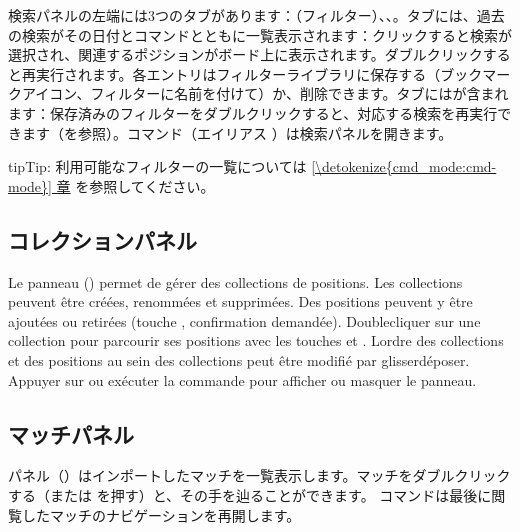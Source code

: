 \documentclass[letterpaper,10pt,dvipdfmx]{sphinxmanual}
\begin{document}
\sphinxAtStartPar
検索パネルの左端には3つのタブがあります：（フィルター）、、。タブには、過去の検索がその日付とコマンドとともに一覧表示されます：クリックすると検索が選択され、関連するポジションがボード上に表示されます。ダブルクリックすると再実行されます。各エントリはフィルターライブラリに保存する（ブックマークアイコン、フィルターに名前を付けて）か、削除できます。タブにはが含まれます：保存済みのフィルターをダブルクリックすると、対応する検索を再実行できます（{\hyperref[\detokenize{annexe_filtres:annexe-filtres}]{}}を参照）。コマンド（エイリアス ）は検索パネルを開きます。

\begin{sphinxadmonition}{tip}{Tip:}
\sphinxAtStartPar
利用可能なフィルターの一覧については \hyperref[\detokenize{cmd_mode:cmd-mode}]{\ref{\detokenize{cmd_mode:cmd-mode}} 章} を参照してください。
\end{sphinxadmonition}


\subsection{コレクションパネル}
\label{\detokenize{manuel:panneau-collections}}\label{\detokenize{manuel:id6}}
\sphinxAtStartPar
Le panneau  () permet de gérer des collections de
positions. Les collections peuvent être créées, renommées et supprimées. Des
positions peuvent y être ajoutées ou retirées (touche , confirmation
demandée). Double\sphinxhyphen{}cliquer sur une collection pour parcourir ses positions
avec les touches  et . L\textquotesingle{}ordre des collections et des
positions au sein des collections peut être modifié par glisser\sphinxhyphen{}déposer.
Appuyer sur  ou exécuter la commande  pour afficher ou
masquer le panneau.


\subsection{マッチパネル}
\label{\detokenize{manuel:panneau-matchs}}\label{\detokenize{manuel:id7}}
\sphinxAtStartPar
{} パネル（）はインポートしたマッチを一覧表示します。マッチをダブルクリックする（または  を押す）と、その手を辿ることができます。 コマンドは最後に閲覧したマッチのナビゲーションを再開します。
\end{document}
